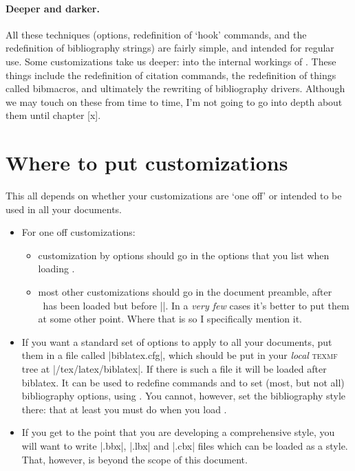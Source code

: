 \paragraph{Deeper and darker.}
All these techniques (options, redefinition of `hook' commands, and
the redefinition of bibliography strings) are fairly simple, and
intended for regular use. Some customizations take us deeper: into the
internal workings of \biblatex. These things include the redefinition
of citation commands, the redefinition of things called bibmacros, and
ultimately the rewriting of bibliography drivers. Although we may
touch on these from time to time, I'm not going to go into depth about
them until chapter [x].

\section{Where to put customizations}

This all depends on whether your customizations are `one off' or
intended to be used in all your documents.
\begin{itemize}
\item For one off customizations:
\begin{itemize}
\item customization by options should go in the options that you list
  when loading \biblatex.
\item most other customizations should go in the document preamble, after
  \biblatex\ has been loaded but before ||. In a \emph{very
  few} cases it's better to put them at some other point. Where that is so
  I specifically mention it.
\end{itemize}
\item If you want a standard set of options to apply to all your
  documents, put them in a file called |biblatex.cfg|, which should be put in your
  \emph{local} \textsc{texmf} tree at |/tex/latex/biblatex|. If there is such
  a file it will be loaded after biblatex. It can be used to redefine commands
  and to set (most, but not all) bibliography options, using . You cannot, however, set the bibliography style there: that at least you must do when you load \biblatex.
\item If you get to the point that you are developing a comprehensive style, you will want to write |.bbx|, |.lbx| and |.cbx| files which can be loaded as a style. That, however, is beyond the scope of this document.
\end{itemize}
